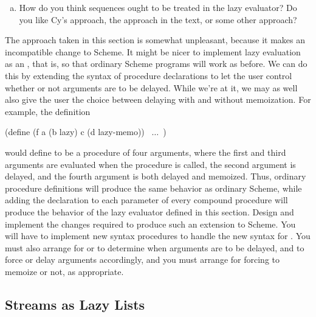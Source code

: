 \begin{exerciseGroup}
\begin{enumerate}[a.]
\item
How do you think sequences ought to be treated in the lazy evaluator?  Do you
like Cy's approach, the approach in the text, or some other approach?

\end{enumerate}

\label{Exercise 4.31}
 The approach taken in this
section is somewhat unpleasant, because it makes an incompatible change to
Scheme.  It might be nicer to implement lazy evaluation as an
, that is, so that ordinary Scheme
programs will work as before.  We can do this by extending the syntax of
procedure declarations to let the user control whether or not arguments are to
be delayed.  While we're at it, we may as well also give the user the choice
between delaying with and without memoization.  For example, the definition

\begin{codeBlock}
(define (f a (b lazy) c (d lazy-memo))
  ~\( \dots \)~)
\end{codeBlock}

\noindent
would define  to be a procedure of four arguments, where the first and
third arguments are evaluated when the procedure is called, the second argument
is delayed, and the fourth argument is both delayed and memoized.  Thus,
ordinary procedure definitions will produce the same behavior as ordinary
Scheme, while adding the  declaration to each parameter of
every compound procedure will produce the behavior of the lazy evaluator
defined in this section. Design and implement the changes required to produce
such an extension to Scheme.  You will have to implement new syntax procedures
to handle the new syntax for .  You must also arrange for
 or  to determine when arguments are to be delayed, and
to force or delay arguments accordingly, and you must arrange for forcing to
memoize or not, as appropriate.
\end{exerciseGroup}

\subsection{Streams as Lazy Lists}
\label{Section 4.2.3}

